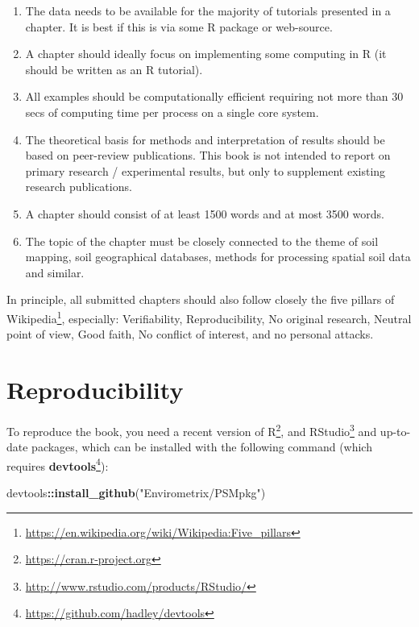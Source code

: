 \documentclass[graybox,natbib,nospthms,UStrade]{svmono}
\newenvironment{Shaded}{\begin{snugshade}}{\end{snugshade}}
\newcommand{\KeywordTok}[1]{\textcolor[rgb]{0.27,0.27,0.27}{\textbf{#1}}}
\newcommand{\NormalTok}[1]{#1}
\newcommand{\OperatorTok}[1]{\textcolor[rgb]{0.43,0.43,0.43}{\textbf{#1}}}
\newcommand{\StringTok}[1]{\textcolor[rgb]{0.5,0.5,0.5}{#1}}
\providecommand{\tightlist}{%
  \setlength{\itemsep}{0pt}\setlength{\parskip}{0pt}}
\providecommand{\tightlist}{\setlength{\itemsep}{0pt}\setlength{\parskip}{0pt}}
\renewcommand{\href}[2]{#2 (\url{#1})}
\renewcommand{\href}[2]{#2\footnote{\url{#1}}}
\begin{document}
\begin{enumerate}
\def\labelenumi{\arabic{enumi}.}
\tightlist
\item
  The data needs to be available for the majority of tutorials presented in a chapter. It is best if this is via some R package or web-source.
\item
  A chapter should ideally focus on implementing some computing in R (it should be written as an R tutorial).
\item
  All examples should be computationally efficient requiring not more than 30 secs of computing time per process on a single core system.
\item
  The theoretical basis for methods and interpretation of results should be based on peer-review publications. This book is not intended to report on primary research / experimental results, but only to supplement existing research publications.
\item
  A chapter should consist of at least 1500 words and at most 3500 words.
\item
  The topic of the chapter must be closely connected to the theme of soil mapping, soil geographical databases, methods for processing spatial soil data and similar.
\end{enumerate}

In principle, all submitted chapters should also follow closely the \href{https://en.wikipedia.org/wiki/Wikipedia:Five_pillars}{five pillars of Wikipedia}, especially: Verifiability, Reproducibility, No original research, Neutral point of view, Good faith, No conflict of interest, and no personal attacks.

\hypertarget{reproducibility}{%
\section*{Reproducibility}\label{reproducibility}}

To reproduce the book, you need a recent version of \href{https://cran.r-project.org}{R}, and \href{http://www.rstudio.com/products/RStudio/}{RStudio} and up-to-date packages, which can be installed with the following command (which requires \href{https://github.com/hadley/devtools}{\textbf{devtools}}):

\begin{Shaded}
\begin{Highlighting}[]
\NormalTok{devtools}\OperatorTok{::}\KeywordTok{install_github}\NormalTok{(}\StringTok{"Envirometrix/PSMpkg"}\NormalTok{)}
\end{Highlighting}
\end{Shaded}
\end{document}
